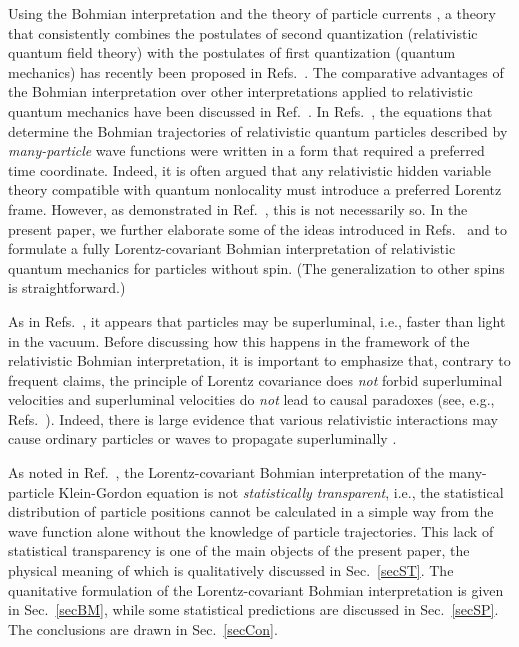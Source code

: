 \documentclass[12pt]{article}
\begin{document}
Using the Bohmian interpretation 
\cite{bohm,bohmPR1,bohmPR2,holPR,holbook} and the theory of 
particle currents \cite{nikcur1,nikcur2,nikcur3},
a theory that consistently combines 
the postulates of second quantization 
(relativistic quantum field theory) with the postulates of 
first quantization 
(quantum mechanics) has recently been proposed in 
Refs.~\cite{nikoldbb1,nikoldbb2}. The comparative advantages of the Bohmian 
interpretation over other interpretations applied to relativistic 
quantum mechanics have been discussed in Ref.~\cite{nikoldbb3}.
In Refs.~\cite{nikoldbb1,nikoldbb2}, the equations that determine 
the Bohmian trajectories of relativistic quantum particles
described by {\em many-particle} wave functions
were written in a form that required a preferred time 
coordinate. Indeed, it is often argued that any relativistic 
hidden variable theory compatible with quantum nonlocality 
must introduce a preferred Lorentz frame. However, as 
demonstrated in Ref.~\cite{bern}, this is not necessarily so.
In the present paper, we further elaborate some of the ideas introduced 
in Refs.~\cite{nikoldbb1} and \cite{bern}
to formulate a fully Lorentz-covariant Bohmian interpretation of 
relativistic quantum mechanics for particles without spin. 
(The generalization to other spins is straightforward.)


As in Refs.~\cite{bern,nikoldbb1}, it appears that particles may 
be superluminal, i.e., faster than light in the vacuum.
Before discussing how this happens in the framework of the relativistic 
Bohmian interpretation, it is important to emphasize that, 
contrary to frequent claims, the principle of Lorentz covariance
does {\em not} forbid superluminal velocities and superluminal 
velocities do {\em not} lead to 
causal paradoxes (see, e.g., Refs.~\cite{lib,nikolcaus}). Indeed, there is  
large evidence that various relativistic interactions 
may cause ordinary particles or waves to propagate superluminally
\cite{gar,chu,drum,sch,chi,bol,chi2,nik}.

As noted in Ref.~\cite{bern}, the Lorentz-covariant Bohmian interpretation 
of the many-particle Klein-Gordon equation is not 
{\em statistically transparent}, i.e., the statistical distribution
of particle positions cannot be calculated in a simple way 
from the wave function alone without the knowledge of  
particle trajectories. This lack of statistical transparency 
is one of the main objects of the present paper, the physical 
meaning of which is qualitatively discussed in Sec.~\ref{secST}.
The quanitative formulation of the Lorentz-covariant Bohmian interpretation
is given in Sec.~\ref{secBM}, while some statistical predictions 
are discussed in Sec.~\ref{secSP}.
The conclusions are drawn in Sec.~\ref{secCon}. 
\end{document}
